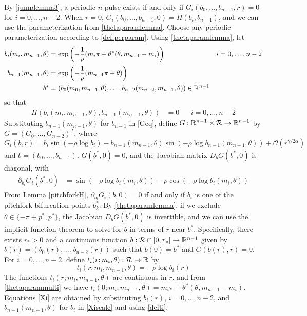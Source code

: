 \documentclass[10pt,reqno]{amsart}
\theoremstyle{plain}
\theoremstyle{definition}
\theoremstyle{remark}
\numberwithin{theorem}{section}
\numberwithin{equation}{section}
\begin{document}
By \cref{jumplemma3}, a periodic $n$-pulse exists if and only if $G_i(b_0, \dots, b_{n-1}, r) = 0$ for $i = 0, \dots, n-2$. When $r = 0$, $G_i(b_0, \dots, b_{n-1}, 0) = H(b_i, b_{n-1})$, and we can use the parameterization from \cref{thetaparamlemma}. Choose any periodic parameterization according to \cref{def:perparam}. Using \cref{thetaparamlemma}, let
\begin{equation}\label{thetaparammulti}
\begin{aligned}
b_i( m_i, m_{n-1}, \theta) &= \mathop\mathrm{exp}\nolimits\left( -\frac{1}{\rho}(m_i \pi + \theta^*(\theta, m_{n-1} - m_i) \right) && i = 0, \dots, n-2 \\
b_{n-1}( m_{n-1}, \theta) &= \mathop\mathrm{exp}\nolimits\left( -\frac{1}{\rho}(m_{n-1} \pi + \theta) \right) \\
b^* &= (b_0( m_0, m_{n-1}, \theta), \dots, b_{n-2}( m_{n-2}, m_{n-1}, \theta) ) \in \mathbb{R}^{n-1}
\end{aligned}
\end{equation}
so that
\begin{align*}
H(b_i( m_i, m_{n-1}, \theta), b_{n-1}( m_{n-1}, \theta) ) &= 0 && i = 0, \dots, n-2
\end{align*}
Substituting $b_{n-1}(m_{n-1}, \theta)$ for $b_{n-1}$ in \eqref{Geq}, define $G: \mathbb{R}^{n-1} \times \mathcal{R} \rightarrow \mathbb{R}^{n-1}$ by $G = (G_0, \dots, G_{n-2})^T$, where 
\begin{equation*}
G_i(b, r) = b_i \sin \left( -\rho \log b_i \right) - b_{n-1}(m_{n-1}, \theta) \sin \left( -\rho \log b_{n-1}(m_{n-1}, \theta) \right) + \mathcal{O}(r^{\gamma / 2 \alpha})
\end{equation*}
and $b = (b_0, \dots, b_{n-1})$. $G(b^*, 0) = 0$, and the Jacobian matrix $D_b G(b^*,0)$ is diagonal, with
\begin{align*}
\partial_{b_i} G_i(b^*, 0)
&= \sin \left( -\rho \log b_i(m_i, \theta) \right) - \rho \cos \left( -\rho \log b_i(m_i, \theta) \right)
\end{align*}
From Lemma \ref{pitchforkH}, $\partial_{b_i} G_i(b, 0) = 0$ if and only if $b_i$ is one of the pitchfork bifurcation points $b_k^*$. By \cref{thetaparamlemma}, if we exclude $\theta \in \{ -\pi + p^*, p^* \}$, the Jacobian $D_b G(b^*,0)$ is invertible, and we can use the implicit function theorem to solve for $b$ in terms of $r$ near $b^*$. Specifically, there exists $r_* > 0$ and a continuous function $b: \mathcal{R} \cap [0, r_*] \rightarrow \mathbb{R}^{n-1}$ given by $b(r) = \left( b_0(r), \dots, b_{n-2}(r) \right)$ such that $b(0) = b^*$ and $G(b(r),r) = 0$. For $i = 0, \dots, n-2$, define $t_i(r; m_i, \theta): \mathcal{R} \rightarrow \mathbb{R}$ by
\begin{equation}\label{defti}
t_i(r; m_i, m_{n-1}, \theta) = -\rho \log b_i(r)
\end{equation}
The functions $t_i(r; m_i, m_{n-1}, \theta)$ are continuous in $r$, and from \cref{thetaparammulti} we have $t_i(0; m_i, m_{n-1}, \theta) = m_i \pi + \theta^*(\theta, m_{n-1} - m_i)$. Equations \cref{Xi} are obtained by substituting $b_i(r)$, $i = 0, \dots, n-2$, and $b_{n-1}(m_{n-1}, \theta)$ for $b_i$ in \cref{Xiscale} and using \cref{defti}.
\end{document}
